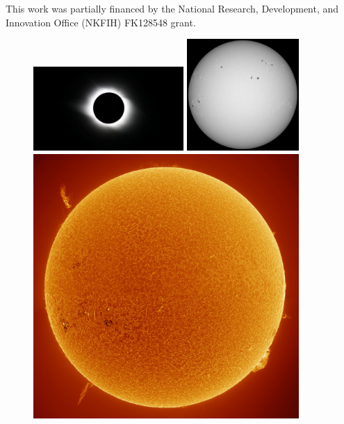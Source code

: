 \documentclass[sn-aps]{sn-jnl}%
\begin{document}
\backmatter


This work was partially financed by the National Research, Development, and Innovation Office (NKFIH) FK128548 grant.


\pagebreak

%



\pagebreak

\begin{figure}[h]
\centering
\includegraphics[width=0.51\textwidth]{facsko_iccecip2022-f01a.eps}
\includegraphics[width=0.38\textwidth]{facsko_iccecip2022-f01b.eps}
\includegraphics[width=0.9\textwidth]{facsko_iccecip2022-f01c.eps}

\end{figure}
\end{document}
